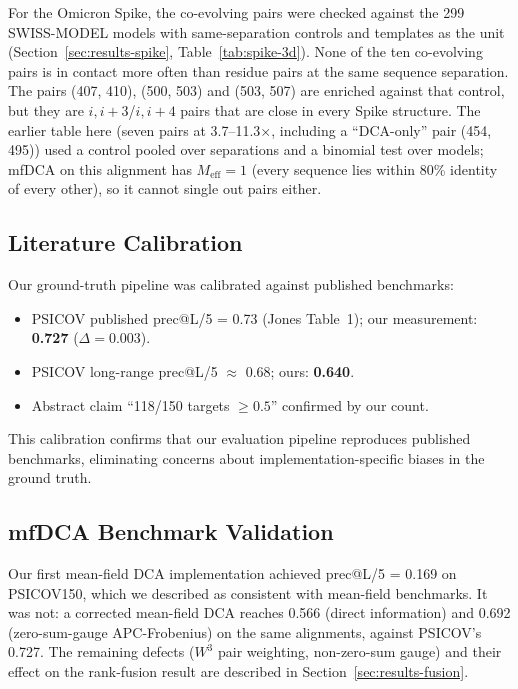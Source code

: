 For the Omicron Spike, the co-evolving pairs were checked against the 299
SWISS-MODEL models with same-separation controls and templates as the unit
(Section~\ref{sec:results-spike}, Table~\ref{tab:spike-3d}).  None of the ten
co-evolving pairs is in contact more often than residue pairs at the same
sequence separation.  The pairs (407, 410), (500, 503) and (503, 507) are
enriched against that control, but they are $i,i{+}3$/$i,i{+}4$ pairs that are
close in every Spike structure.  The earlier table here (seven pairs at
3.7--11.3$\times$, including a ``DCA-only'' pair (454, 495)) used a control
pooled over separations and a binomial test over models; mfDCA on this
alignment has $M_{\text{eff}} = 1$ (every sequence lies within 80\% identity
of every other), so it cannot single out pairs either.

\subsection{Literature Calibration}

Our ground-truth pipeline was calibrated against published benchmarks:
\begin{itemize}[nosep]
	\item PSICOV published prec@L/5 = 0.73 (Jones Table~1); our measurement:
	      \textbf{0.727} ($\Delta = 0.003$).
	\item PSICOV long-range prec@L/5 $\approx$ 0.68; ours: \textbf{0.640}.
	\item Abstract claim ``118/150 targets $\geq 0.5$'' confirmed by our count.
\end{itemize}

This calibration confirms that our evaluation pipeline reproduces published
benchmarks, eliminating concerns about implementation-specific biases in the
ground truth.

\subsection{mfDCA Benchmark Validation}

Our first mean-field DCA implementation achieved prec@L/5 = 0.169 on
PSICOV150, which we described as consistent with mean-field benchmarks.  It
was not: a corrected mean-field DCA reaches 0.566 (direct information) and
0.692 (zero-sum-gauge APC-Frobenius) on the same alignments, against PSICOV's
0.727.  The remaining defects ($W^3$ pair weighting, non-zero-sum gauge) and
their effect on the rank-fusion result are described in
Section~\ref{sec:results-fusion}.
